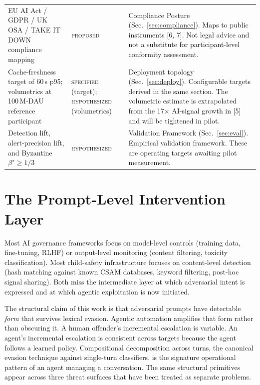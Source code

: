 \documentclass[11pt]{article}
\begin{document}
{\begin{longtable}{@{}p{4.0cm} p{2.1cm} p{8.4cm}@{}}
EU AI Act / GDPR / UK OSA / TAKE IT DOWN compliance mapping & \textsc{proposed} & Compliance Posture (Sec.~\ref{sec:compliance}). Maps to public instruments [6, 7]. Not legal advice and not a substitute for participant-level conformity assessment. \\

Cache-freshness target of 60\,s p95; volumetrics at 100\,M-DAU reference participant & \textsc{specified} \newline (target); \textsc{hypothesized} (volumetrics) & Deployment topology (Sec.~\ref{sec:deploy}). Configurable targets derived in the same section. The volumetric estimate is extrapolated from the 17$\times$ AI-signal growth in [5] and will be tightened in pilot. \\

Detection lift, alert-precision lift, and Byzantine $\beta^\star \geq 1/3$ & \textsc{hypothesized} & Validation Framework (Sec.~\ref{sec:eval}). Empirical validation framework. These are operating targets awaiting pilot measurement. \\

\end{longtable}
}

\section{The Prompt-Level Intervention Layer}
\label{sec:layer}

Most AI governance frameworks focus on model-level controls (training data, fine-tuning, RLHF) or output-level monitoring (content filtering, toxicity classification). Most child-safety infrastructure focuses on content-level detection (hash matching against known CSAM databases, keyword filtering, post-hoc signal sharing). Both miss the intermediate layer at which adversarial intent is expressed and at which agentic exploitation is now initiated.

The structural claim of this work is that adversarial prompts have detectable \emph{form} that survives lexical evasion. Agentic automation amplifies that form rather than obscuring it. A human offender's incremental escalation is variable. An agent's incremental escalation is consistent across targets because the agent follows a learned policy. Compositional decomposition across turns, the canonical evasion technique against single-turn classifiers, is the signature operational pattern of an agent managing a conversation. The same structural primitives appear across three threat surfaces that have been treated as separate problems.
\end{document}
